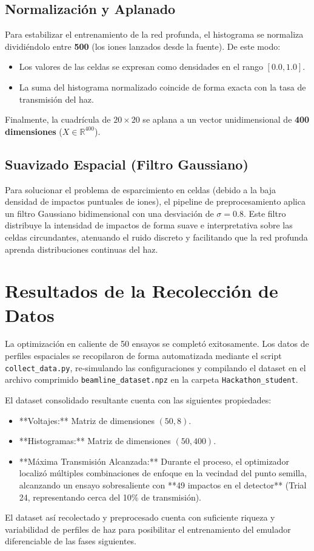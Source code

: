 \documentclass[12pt,letterpaper]{article}
\begin{document}
\subsection{Normalización y Aplanado}
Para estabilizar el entrenamiento de la red profunda, el histograma se normaliza dividiéndolo entre \textbf{500} (los iones lanzados desde la fuente). De este modo:
\begin{itemize}
    \item Los valores de las celdas se expresan como densidades en el rango $[0.0, 1.0]$.
    \item La suma del histograma normalizado coincide de forma exacta con la tasa de transmisión del haz.
\end{itemize}
Finalmente, la cuadrícula de $20 \times 20$ se aplana a un vector unidimensional de \textbf{400 dimensiones} ($X \in \mathbb{R}^{400}$).

\subsection{Suavizado Espacial (Filtro Gaussiano)}
Para solucionar el problema de esparcimiento en celdas (debido a la baja densidad de impactos puntuales de iones), el pipeline de preprocesamiento aplica un filtro Gaussiano bidimensional con una desviación de $\sigma = 0.8$. Este filtro distribuye la intensidad de impactos de forma suave e interpretativa sobre las celdas circundantes, atenuando el ruido discreto y facilitando que la red profunda aprenda distribuciones continuas del haz.

\section{Resultados de la Recolección de Datos}
La optimización en caliente de 50 ensayos se completó exitosamente. Los datos de perfiles espaciales se recopilaron de forma automatizada mediante el script \texttt{collect\_data.py}, re-simulando las configuraciones y compilando el dataset en el archivo comprimido \texttt{beamline\_dataset.npz} en la carpeta \texttt{Hackathon\_student}.

El dataset consolidado resultante cuenta con las siguientes propiedades:
\begin{itemize}
    \item **Voltajes:** Matriz de dimensiones $(50, 8)$.
    \item **Histogramas:** Matriz de dimensiones $(50, 400)$.
    \item **Máxima Transmisión Alcanzada:** Durante el proceso, el optimizador localizó múltiples combinaciones de enfoque en la vecindad del punto semilla, alcanzando un ensayo sobresaliente con **49 impactos en el detector** (Trial 24, representando cerca del 10\% de transmisión).
\end{itemize}

El dataset así recolectado y preprocesado cuenta con suficiente riqueza y variabilidad de perfiles de haz para posibilitar el entrenamiento del emulador diferenciable de las fases siguientes.
\end{document}
